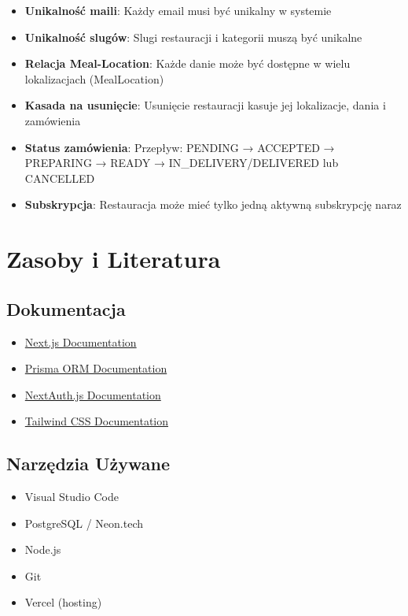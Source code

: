 \documentclass[12pt,a4paper,utf-8]{article}
\begin{document}
\begin{itemize}
    \item \textbf{Unikalność maili}: Każdy email musi być unikalny w systemie
    \item \textbf{Unikalność slugów}: Slugi restauracji i kategorii muszą być unikalne
    \item \textbf{Relacja Meal-Location}: Każde danie może być dostępne w wielu lokalizacjach (MealLocation)
    \item \textbf{Kasada na usunięcie}: Usunięcie restauracji kasuje jej lokalizacje, dania i zamówienia
    \item \textbf{Status zamówienia}: Przepływ: PENDING → ACCEPTED → PREPARING → READY → IN\_DELIVERY/DELIVERED lub CANCELLED
    \item \textbf{Subskrypcja}: Restauracja może mieć tylko jedną aktywną subskrypcję naraz
\end{itemize}

\newpage

\section{Zasoby i Literatura}

\subsection{Dokumentacja}

\begin{itemize}
    \item \href{https://nextjs.org/}{Next.js Documentation}
    \item \href{https://www.prisma.io/}{Prisma ORM Documentation}
    \item \href{https://next-auth.js.org/}{NextAuth.js Documentation}
    \item \href{https://tailwindcss.com/}{Tailwind CSS Documentation}
\end{itemize}

\subsection{Narzędzia Używane}

\begin{itemize}
    \item Visual Studio Code
    \item PostgreSQL / Neon.tech
    \item Node.js
    \item Git
    \item Vercel (hosting)
\end{itemize}
\end{document}
